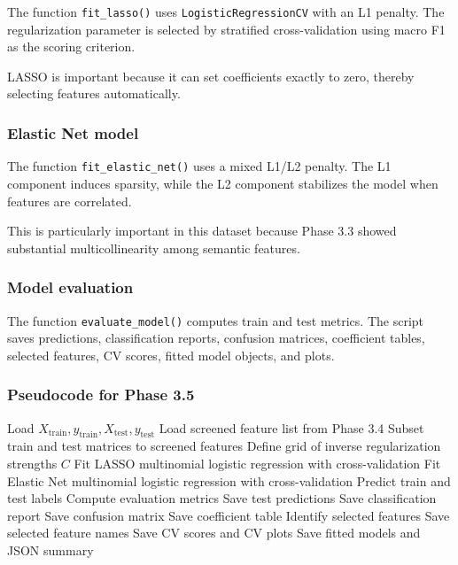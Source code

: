 \documentclass{ipgpmaster}
\begin{document}
The function \texttt{fit\_lasso()} uses \texttt{LogisticRegressionCV} with an L1 penalty. The regularization parameter is selected by stratified cross-validation using macro F1 as the scoring criterion.

LASSO is important because it can set coefficients exactly to zero, thereby selecting features automatically.

\subsubsection{Elastic Net model}

The function \texttt{fit\_elastic\_net()} uses a mixed L1/L2 penalty. The L1 component induces sparsity, while the L2 component stabilizes the model when features are correlated.

This is particularly important in this dataset because Phase 3.3 showed substantial multicollinearity among semantic features.

\subsubsection{Model evaluation}

The function \texttt{evaluate\_model()} computes train and test metrics. The script saves predictions, classification reports, confusion matrices, coefficient tables, selected features, CV scores, fitted model objects, and plots.

\subsubsection{Pseudocode for Phase 3.5}

\begin{algorithm}[H]
\caption{Phase 3.5: LASSO and Elastic Net}
\begin{algorithmic}[1]
\State Load \(X_{\text{train}}, y_{\text{train}}, X_{\text{test}}, y_{\text{test}}\)
\State Load screened feature list from Phase 3.4
\State Subset train and test matrices to screened features
\State Define grid of inverse regularization strengths \(C\)
\State Fit LASSO multinomial logistic regression with cross-validation
\State Fit Elastic Net multinomial logistic regression with cross-validation
    \State Predict train and test labels
    \State Compute evaluation metrics
    \State Save test predictions
    \State Save classification report
    \State Save confusion matrix
    \State Save coefficient table
    \State Identify selected features
    \State Save selected feature names
    \State Save CV scores and CV plots
\EndFor
\State Save fitted models and JSON summary
\end{algorithmic}
\end{algorithm}
\end{document}
